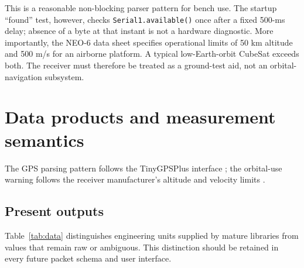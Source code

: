 \documentclass[11pt,a4paper]{article}
\newcommand{\code}[1]{\texttt{#1}}
\begin{document}
This is a reasonable non-blocking parser pattern for bench use. The startup ``found'' test, however, checks \code{Serial1.available()} once after a fixed 500-ms delay; absence of a byte at that instant is not a hardware diagnostic. More importantly, the NEO-6 data sheet specifies operational limits of 50 km altitude and 500 m/s for an airborne platform. A typical low-Earth-orbit CubeSat exceeds both. The receiver must therefore be treated as a ground-test aid, not an orbital-navigation subsystem.

\section{Data products and measurement semantics}

The GPS parsing pattern follows the TinyGPSPlus interface \cite{tinygps}; the orbital-use warning follows the receiver manufacturer's altitude and velocity limits \cite{neo6}.

\subsection{Present outputs}

Table~\ref{tab:data} distinguishes engineering units supplied by mature libraries from values that remain raw or ambiguous. This distinction should be retained in every future packet schema and user interface.
\end{document}
